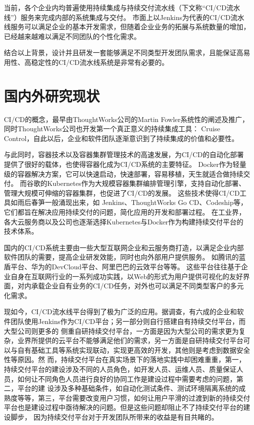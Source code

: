 当前，各个企业内均普遍使用持续集成与持续交付流水线（下文称“CI/CD流水线”）服务来完成内部的系统集成与交付。
市面上以Jenkins为代表的CI/CD流水线服务可以满足企业的基本开发需求，但随着企业业务的拓展与系统数量的增加，已经越来越难以满足不同团队的个性化需求。

结合以上背景，设计并且研发一套能够满足不同类型开发团队需求，且能保证高易用性、高稳定性的CI/CD流水线系统是非常有必要的。


\section{国内外研究现状}
CI/CD的概念，最早由ThoughtWorks公司的Martin Fowler系统性的阐述及推广\cite{CI首作}，同时ThoughtWorks公司也开发第一个真正意义的持续集成工具：
Cruise Control\cite{绪论持续集成1}，自此以后，企业和软件团队逐渐意识到了持续集成的价值和必要性。

与此同时，容器技术以及容器集群管理技术的高速发展，为CI/CD的自动化部署提供了很好的载体\cite{docker}，也使得容器化成为CI/CD系统的主要特征。
Docker作为轻量级的容器解决方案，它可以快速启动，快速部署，容易移植，天生就适合做持续交付。
而谷歌的Kubernetes作为大规模容器集群编排管理引擎，支持自动化部署、管理大规模可伸缩的容器集群，也促进了CI/CD的发展。
这些技术使得CI/CD工具如雨后春笋一般涌现出来，如 Jenkins、ThoughtWorks Go CD、Codeship等，它们都旨在解决应用持续交付的问题，简化应用的开发和部署过程。
在工业界，各大云服务商以及公司也逐渐选择Kubernetes与Docker作为构建持续交付平台的技术体系。




国内的CI/CD系统主要由一些大型互联网企业和云服务商打造，以满足企业内部软件团队的需要，提高企业研发效能，同时也向外部用户提供服务。
如腾讯的蓝盾平台、华为的DevCloud平台、阿里巴巴的云效平台等等。
这些平台往往基于企业自身在互联网行业的一系列成功实践，以Web的形式为用户提供可视化的友好界面，对内承载企业自有业务的CI/CD任务，对外也可以满足不同类型客户的多元化需求。

现如今，CI/CD流水线平台得到了极为广泛的应用。据调查，有六成的企业和软件团队使用Jenkins作为CI/CD平台\cite{DevOps中国调查研究}；另一部分则自行搭建自有持续交付平台，而大型公司则更多的
侧重自研持续交付平台，一方面是因为大型公司的需求更为复杂，业界所提供的云平台不能够满足他们的需求，另一方面是自研持续交付平台可以与自有基础工具等系统实现联动，实现更高效的开发，其他则是考虑到数据安全性等原因。然
而，持续交付平台在真实场景下的落地实践中却困难重重，第一，持续交付平台的建设涉及不同的人员角色，如开发人员、运维人员、质量保证人员，如何让不同角色人员进行良好的协同工作是建设过程中需要考虑的问题，第二，平台的建
设涉及多种基础条件，如自动化测试条件、测试环境隔离系统的成熟度等等，第三，平台需要改变用户习惯，如何让用户平滑的过渡到新的持续交付平台也是建设过程中亟待解决的问题。但是这些问题却阻止不了持续交付平台的建设脚步，
因为持续交付平台对于开发团队所带来的收益是有目共睹的。


